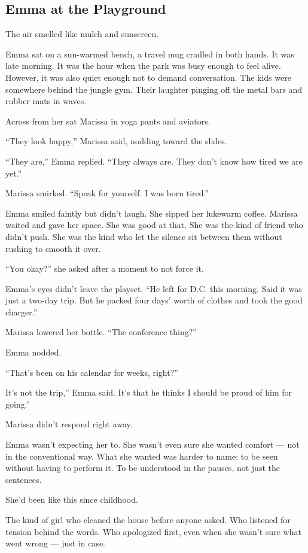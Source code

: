 \subsection{Emma at the Playground}

The air smelled like mulch and sunscreen.

Emma sat on a sun-warmed bench, a travel mug cradled in both hands. 
It was late morning. 
It was the hour when the park was busy enough to feel alive. 
However, it was also quiet enough not to demand conversation. 
The kids were somewhere behind the jungle gym. 
Their laughter pinging off the metal bars and rubber mats in waves.

Across from her sat Marissa in yoga pants and aviators.

``They look happy,'' Marissa said, nodding toward the slides.

``They are,'' Emma replied. ``They always are. They don’t know how tired we are yet.''

Marissa smirked. ``Speak for yourself. I was born tired.''

Emma smiled faintly but didn’t laugh. 
She sipped her lukewarm coffee. 
Marissa waited and gave her space. 
She was good at that. 
She was the kind of friend who didn’t push. 
She was the kind who let the silence sit between them without rushing to smooth it over.

``You okay?'' she asked after a moment to not force it.

Emma’s eyes didn’t leave the playset. ``He left for D.C. this morning. Said it was just a two-day trip. 
But he packed four days’ worth of clothes and took the good charger.''

Marissa lowered her bottle. ``The conference thing?''

Emma nodded.

``That’s been on his calendar for weeks, right?''

It’s not the trip,'' Emma said. It’s that he thinks I should be proud of him for going.''

Marissa didn’t respond right away.

Emma wasn’t expecting her to.
She wasn’t even sure she wanted comfort — not in the conventional way.
What she wanted was harder to name: to be seen without having to perform it.
To be understood in the pauses, not just the sentences.

She’d been like this since childhood.

The kind of girl who cleaned the house before anyone asked.
Who listened for tension behind the words.
Who apologized first, even when she wasn’t sure what went wrong — just in case.

